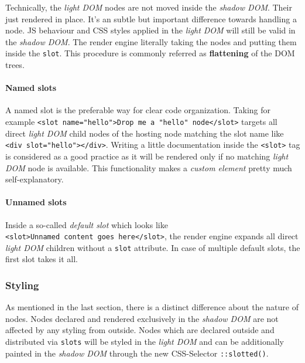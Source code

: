 \documentclass[]{article}
\let\oldparagraph\paragraph
\renewcommand{\paragraph}[1]{\oldparagraph{#1}\mbox{}}
\begin{document}
Technically, the \emph{light DOM} nodes are not moved inside the
\emph{shadow DOM}. Their just rendered in place. It's an subtle but
important difference towards handling a node. JS behaviour and CSS
styles applied in the \emph{light DOM} will still be valid in the
\emph{shadow DOM}. The render engine literally taking the nodes and
putting them inside the \texttt{slot}. This procedure is commonly
referred as \textbf{flattening} of the DOM trees.

\paragraph{Named slots}\label{named-slots}

A named slot is the preferable way for clear code organization. Taking
for example
\texttt{\textless{}slot\ name="hello"\textgreater{}Drop\ me\ a\ "hello"\ node\textless{}/slot\textgreater{}}
targets all direct \emph{light DOM} child nodes of the hosting node
matching the slot name like
\texttt{\textless{}div\ slot="hello"\textgreater{}\textless{}/div\textgreater{}}.
Writing a little documentation inside the
\texttt{\textless{}slot\textgreater{}} tag is considered as a good
practice as it will be rendered only if no matching \emph{light DOM}
node is available. This functionality makes a \emph{custom element}
pretty much self-explanatory.

\paragraph{Unnamed slots}\label{unnamed-slots}

Inside a so-called \emph{default slot} which looks like
\texttt{\textless{}slot\textgreater{}Unnamed\ content\ goes\ here\textless{}/slot\textgreater{}},
the render engine expands all direct \emph{light DOM} children without a
\texttt{slot} attribute. In case of multiple default slots, the first
slot takes it all.

\subsubsection{Styling}\label{styling}

As mentioned in the last section, there is a distinct difference about
the nature of nodes. Nodes declared and rendered exclusively in the
\emph{shadow DOM} are not affected by any styling from outside. Nodes
which are declared outside and distributed via \texttt{slots} will be
styled in the \emph{light DOM} and can be additionally painted in the
\emph{shadow DOM} through the new CSS-Selector \texttt{::slotted()}.
\end{document}
